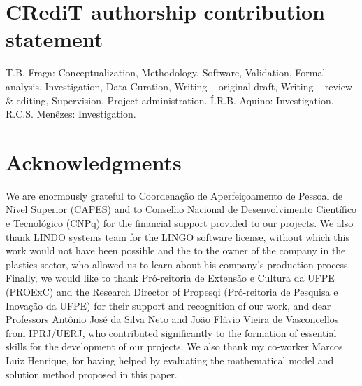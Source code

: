 \documentclass[authoryear,manuscript,12pt]{elsarticle}
\begin{document}
\section{CRediT authorship contribution statement} 
\label{sec:contributions}

T.B. Fraga: Conceptualization, Methodology, Software, Validation, Formal analysis, Investigation, Data Curation, Writing – original draft, Writing – review \& editing, Supervision, Project administration. Í.R.B. Aquino: Investigation. R.C.S. Menêzes: Investigation.

\section{Acknowledgments}
\label{sec:acknowledgments}

We are enormously grateful to Coordenação de Aperfeiçoamento de Pessoal de Nível Superior (CAPES) and to Conselho Nacional de Desenvolvimento Científico e Tecnológico (CNPq) for the financial support provided to our projects. We also thank LINDO systems team for the LINGO software license, without which this work would not have been possible and the to the owner of the company in the plastics sector, who allowed us to learn about his company's production process. Finally, we would like to thank Pró-reitoria de Extensão e Cultura da UFPE (PROExC) and the Research Director of Propesqi (Pró-reitoria de Pesquisa e Inovação da UFPE) for their support and recognition of our work, and dear Professors Antônio José da Silva Neto and João Flávio Vieira de Vasconcellos from IPRJ/UERJ, who contributed significantly to the formation of essential skills for the development of our projects. We also thank my co-worker Marcos Luiz Henrique, for having helped by evaluating the mathematical model and solution method proposed in this paper.




\end{document}
